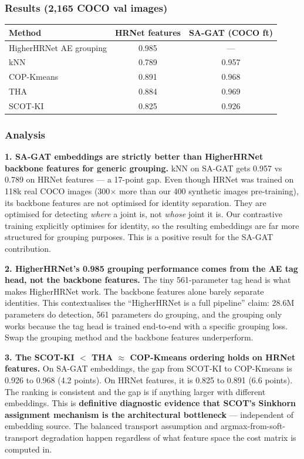 \subsubsection{Results (2,165 COCO val images)}

\begin{tabular}{lcc}
\hline
\textbf{Method} & \textbf{HRNet features} & \textbf{SA-GAT (COCO ft)} \\
\hline
HigherHRNet AE grouping & 0.985 & --- \\
kNN & 0.789 & 0.957 \\
COP-Kmeans & 0.891 & 0.968 \\
THA & 0.884 & 0.969 \\
SCOT-KI & 0.825 & 0.926 \\
\hline
\end{tabular}

\subsubsection{Analysis}

\textbf{1. SA-GAT embeddings are strictly better than HigherHRNet backbone features for generic grouping.} kNN on SA-GAT gets 0.957 vs 0.789 on HRNet features --- a 17-point gap. Even though HRNet was trained on 118k real COCO images (300$\times$ more than our 400 synthetic images pre-training), its backbone features are not optimised for identity separation. They are optimised for detecting \emph{where} a joint is, not \emph{whose} joint it is. Our contrastive training explicitly optimises for identity, so the resulting embeddings are far more structured for grouping purposes. This is a positive result for the SA-GAT contribution.

\textbf{2. HigherHRNet's 0.985 grouping performance comes from the AE tag head, not the backbone features.} The tiny 561-parameter tag head is what makes HigherHRNet work. The backbone features alone barely separate identities. This contextualises the ``HigherHRNet is a full pipeline'' claim: 28.6M parameters do detection, 561 parameters do grouping, and the grouping only works because the tag head is trained end-to-end with a specific grouping loss. Swap the grouping method and the backbone features underperform.

\textbf{3. The SCOT-KI $<$ THA $\approx$ COP-Kmeans ordering holds on HRNet features.} On SA-GAT embeddings, the gap from SCOT-KI to COP-Kmeans is 0.926 to 0.968 (4.2 points). On HRNet features, it is 0.825 to 0.891 (6.6 points). The ranking is consistent and the gap is if anything larger with different embeddings. This is \textbf{definitive diagnostic evidence that SCOT's Sinkhorn assignment mechanism is the architectural bottleneck} --- independent of embedding source. The balanced transport assumption and argmax-from-soft-transport degradation happen regardless of what feature space the cost matrix is computed in.

